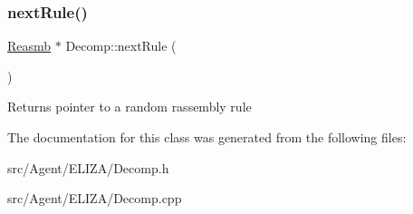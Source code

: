 \subsubsection{\texorpdfstring{next\+Rule()}{nextRule()}}
{\footnotesize\ttfamily \mbox{\hyperlink{classReasmb}{Reasmb}} $\ast$ Decomp\+::next\+Rule (\begin{DoxyParamCaption}{ }\end{DoxyParamCaption})}

\begin{DoxyReturn}{Returns}
pointer to a random rassembly rule 
\end{DoxyReturn}


The documentation for this class was generated from the following files\+:\begin{DoxyCompactItemize}
\item 
src/\+Agent/\+E\+L\+I\+Z\+A/Decomp.\+h\item 
src/\+Agent/\+E\+L\+I\+Z\+A/Decomp.\+cpp\end{DoxyCompactItemize}

